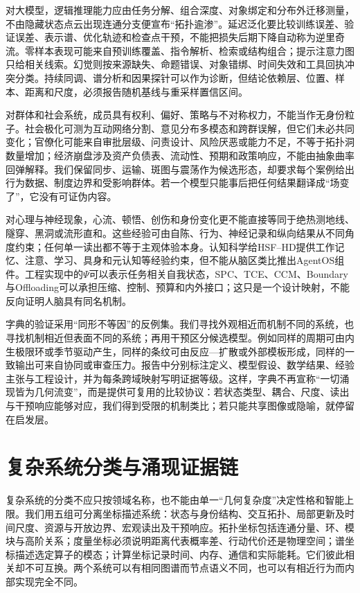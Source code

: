 对大模型，逻辑推理能力应由任务分解、组合深度、对象绑定和分布外迁移测量，不由隐藏状态点云出现连通分支便宣布“拓扑逾渗”。延迟泛化要比较训练误差、验证误差、表示谱、优化轨迹和检查点干预，不能把损失后期下降自动称为逆里奇流。零样本表现可能来自预训练覆盖、指令解析、检索或结构组合；提示注意力图只给相关线索。幻觉则按来源缺失、命题错误、对象错绑、时间失效和工具回执冲突分类。持续同调、谱分析和因果探针可以作为诊断，但结论依赖层、位置、样本、距离和尺度，必须报告随机基线与重采样置信区间。

对群体和社会系统，成员具有权利、偏好、策略与不对称权力，不能当作无身份粒子。社会极化可测为互动网络分割、意见分布多模态和跨群误解，但它们未必共同变化；官僚化可能来自审批层级、问责设计、风险厌恶或能力不足，不等于拓扑洞数量增加；经济崩盘涉及资产负债表、流动性、预期和政策响应，不能由抽象曲率回弹解释。我们保留同步、运输、斑图与震荡作为候选形态，却要求每个案例给出行为数据、制度边界和受影响群体。若一个模型只能事后把任何结果翻译成“场变了”，它没有可证伪内容。

对心理与神经现象，心流、顿悟、创伤和身份变化更不能直接等同于绝热测地线、隧穿、黑洞或流形直和。这些经验可由自陈、行为、神经记录和纵向结果从不同角度约束；任何单一读出都不等于主观体验本身。认知科学给HSF--HD提供工作记忆、注意、学习、具身和元认知等经验约束，但不能从脑区类比推出AgentOS组件。工程实现中的$\Psi$可以表示任务相关自我状态，SPC、TCE、CCM、Boundary与Offloading可以承担压缩、控制、预算和内外接口；这只是一个设计映射，不能反向证明人脑具有同名机制。

字典的验证采用“同形不等因”的反例集。我们寻找外观相近而机制不同的系统，也寻找机制相近但表面不同的系统；再用干预区分候选模型。例如同样的周期可由内生极限环或季节驱动产生，同样的条纹可由反应—扩散或外部模板形成，同样的一致输出可来自协同或审查压力。报告中分别标注定义、模型假设、数学结果、经验主张与工程设计，并为每条跨域映射写明证据等级。这样，字典不再宣称“一切涌现皆为几何流变”，而是提供可复用的比较协议：若状态类型、耦合、尺度、读出与干预响应能够对应，我们得到受限的机制类比；若只能共享图像或隐喻，就停留在启发层。

\section{复杂系统分类与涌现证据链}
\label{sec:geometric_taxonomy_of_complex_systems}

复杂系统的分类不应只按领域名称，也不能由单一“几何复杂度”决定性格和智能上限。我们用五组可分离坐标描述系统：状态与身份结构、交互拓扑、局部更新及时间尺度、资源与开放边界、宏观读出及干预响应。拓扑坐标包括连通分量、环、模块与高阶关系；度量坐标必须说明距离代表概率差、行动代价还是物理空间；谱坐标描述选定算子的模态；计算坐标记录时间、内存、通信和实际能耗。它们彼此相关却不可互换。两个系统可以有相同图谱而节点语义不同，也可以有相近行为而内部实现完全不同。


